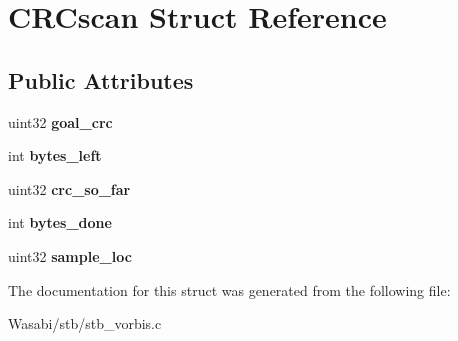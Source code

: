 \hypertarget{struct_c_r_cscan}{}\section{C\+R\+Cscan Struct Reference}
\label{struct_c_r_cscan}
\subsection*{Public Attributes}
\begin{DoxyCompactItemize}
\item 
uint32 {\bfseries goal\+\_\+crc}\hypertarget{struct_c_r_cscan_a530cd3f5d8a6ee4c095e405695b54d04}{}\label{struct_c_r_cscan_a530cd3f5d8a6ee4c095e405695b54d04}

\item 
int {\bfseries bytes\+\_\+left}\hypertarget{struct_c_r_cscan_a8cfbc584d3b4344d02e5d64b50447d1e}{}\label{struct_c_r_cscan_a8cfbc584d3b4344d02e5d64b50447d1e}

\item 
uint32 {\bfseries crc\+\_\+so\+\_\+far}\hypertarget{struct_c_r_cscan_a2604a61beb2f4718d2c0c5641264cebe}{}\label{struct_c_r_cscan_a2604a61beb2f4718d2c0c5641264cebe}

\item 
int {\bfseries bytes\+\_\+done}\hypertarget{struct_c_r_cscan_a74ee9da9e00c74c1f519d31a2d042457}{}\label{struct_c_r_cscan_a74ee9da9e00c74c1f519d31a2d042457}

\item 
uint32 {\bfseries sample\+\_\+loc}\hypertarget{struct_c_r_cscan_a444610761de18db38c7664e702a5e29a}{}\label{struct_c_r_cscan_a444610761de18db38c7664e702a5e29a}

\end{DoxyCompactItemize}


The documentation for this struct was generated from the following file\+:\begin{DoxyCompactItemize}
\item 
Wasabi/stb/stb\+\_\+vorbis.\+c\end{DoxyCompactItemize}
